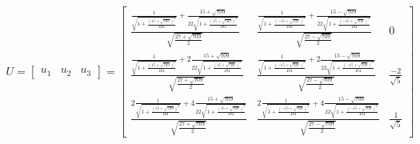 \documentclass[a4paper, spanish]{article}
\begin{document}
    \begin{align}
      U =
      \begin{bmatrix}
        u_1 & u_2 & u_3
      \end{bmatrix} =
      \begin{bmatrix}
        \frac{\frac{1}{\sqrt{1 + \frac{(15 + \sqrt{709})^2}{484}}} +
        \frac{15 + \sqrt{709}}{22\sqrt{1 + \frac{(15 + \sqrt{709})^2}{484}}}}{\sqrt{\frac{27 + \sqrt{709}}{2}}} & \frac{\frac{1}{\sqrt{1 + \frac{(- 15 + \sqrt{709})^2}{484}}} + \frac{15 - \sqrt{709}}{22\sqrt{1 + \frac{(- 15 + \sqrt{709})^2}{484}}}}{\sqrt{\frac{27 - \sqrt{709}}{2}}} & 0 \\
        \frac{\frac{1}{\sqrt{1 + \frac{(15 + \sqrt{709})^2}{484}}} +2
        \frac{15 + \sqrt{709}}{22\sqrt{1 + \frac{(15 + \sqrt{709})^2}{484}}}}{\sqrt{\frac{27 + \sqrt{709}}{2}}} & \frac{\frac{1}{\sqrt{1 + \frac{(- 15 + \sqrt{709})^2}{484}}} + 2
        \frac{15 - \sqrt{709}}{22\sqrt{1 + \frac{(- 15 + \sqrt{709})^2}{484}}}}{\sqrt{\frac{27 - \sqrt{709}}{2}}} & \frac{-2}{\sqrt{5}} \\
        \frac{2\frac{1}{\sqrt{1 + \frac{(15 + \sqrt{709})^2}{484}}} +4
        \frac{15 + \sqrt{709}}{22\sqrt{1 + \frac{(15 + \sqrt{709})^2}{484}}}}{\sqrt{\frac{27 + \sqrt{709}}{2}}} & \frac{2\frac{1}{\sqrt{1 + \frac{(- 15 + \sqrt{709})^2}{484}}} +4
        \frac{15 - \sqrt{709}}{22\sqrt{1 + \frac{(- 15 + \sqrt{709})^2}{484}}}}{\sqrt{\frac{27 - \sqrt{709}}{2}}} & \frac{1}{\sqrt{5}}
      \end{bmatrix}
    \end{align}
\end{document}
